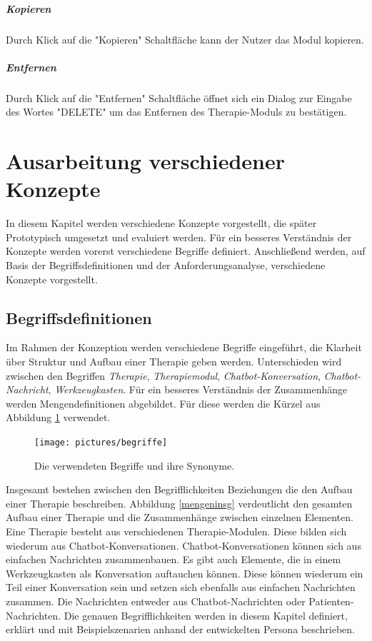 \subparagraph{Kopieren} Durch Klick auf die "Kopieren" Schaltfläche kann der Nutzer das Modul kopieren.

\subparagraph{Entfernen} Durch Klick auf die "Entfernen" Schaltfläche öffnet sich ein Dialog zur Eingabe des Wortes "DELETE" um das Entfernen des Therapie-Moduls zu bestätigen.


\section{Ausarbeitung verschiedener Konzepte}
In diesem Kapitel werden verschiedene Konzepte vorgestellt, die später Prototypisch umgesetzt und evaluiert werden. Für ein besseres Verständnis der Konzepte werden vorerst verschiedene Begriffe definiert. Anschließend werden, auf Basis der Begriffsdefinitionen und der Anforderungsanalyse, verschiedene Konzepte vorgestellt. 

\subsection{Begriffsdefinitionen}

Im Rahmen der Konzeption werden verschiedene Begriffe eingeführt, die Klarheit über Struktur und Aufbau einer Therapie geben werden. Unterschieden wird zwischen den Begriffen \emph{Therapie}, \emph{Therapiemodul}, \emph{Chatbot-Konversation}, \emph{Chatbot-Nachricht}, \emph{Werkzeugkasten}. Für ein besseres Verständnis der Zusammenhänge werden Mengendefinitionen abgebildet. Für diese werden die Kürzel aus Abbildung \ref{begriffe} verwendet.


\begin{figure}[h]
	\centering
	\texttt{[image: pictures/begriffe]}
	\caption{Die verwendeten Begriffe und ihre Synonyme.}
	\label{begriffe}
\end{figure}

Insgesamt bestehen zwischen den Begrifflichkeiten Beziehungen die den Aufbau einer Therapie beschreiben. Abbildung \ref{mengeninsg} verdeutlicht den gesamten Aufbau einer Therapie und die Zusammenhänge zwischen einzelnen Elementen. Eine Therapie besteht aus verschiedenen Therapie-Modulen. Diese bilden sich wiederum aus Chatbot-Konversationen. Chatbot-Konversationen können sich aus einfachen Nachrichten zusammenbauen. Es gibt auch Elemente, die in einem Werkzeugkasten als Konversation auftauchen können. Diese können wiederum ein Teil einer Konversation sein und setzen sich ebenfalls aus einfachen Nachrichten zusammen. Die Nachrichten entweder aus Chatbot-Nachrichten oder Patienten-Nachrichten. Die genauen Begrifflichkeiten werden in diesem Kapitel definiert, erklärt und mit Beispielszenarien anhand der entwickelten Persona beschrieben.

